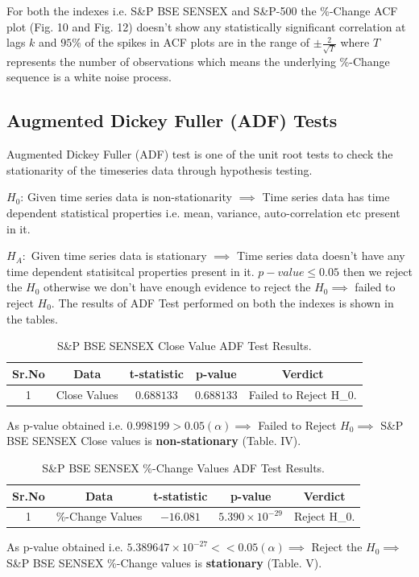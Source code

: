 \documentclass[conference]{IEEEtran}
\begin{document}
For both the indexes i.e. S\&P BSE SENSEX and S\&P-500 the \%-Change ACF plot (Fig. 10 and Fig. 12) doesn't show any statistically significant correlation at lags $k$ and $95\%$ of the spikes in ACF plots are in the range of $\pm \frac{2}{\sqrt{T}}$ where $T$ represents the number of observations which means the underlying \%-Change sequence is a white noise process.

\subsection{Augmented Dickey Fuller (ADF) Tests}
Augmented Dickey Fuller (ADF) test is one of the unit root tests to check the stationarity of the timeseries data through hypothesis testing.

$H_{0}$: Given time series data is non-stationarity $\implies$ Time series data has time dependent statistical properties i.e. mean, variance, auto-correlation etc present in it.

$H_{A}:$ Given time series data is stationary $\implies$ Time series data doesn't have any time dependent statisitcal properties present in it. \newline
$p-value \le 0.05$ then we reject the $H_{0}$ otherwise we don't have enough evidence to reject the $H_{0} \implies$ failed to reject $H_{0}.$ \newline
The results of ADF Test performed on both the indexes is shown in the tables.
\begin{table}[htbp]
	\caption{S\&P BSE SENSEX Close Value ADF Test Results.}
	\begin{tabular}{|c|c|c|c|c|}
		\hline
		\textbf{Sr.No} & \textbf{Data} & \textbf{t-statistic} & \textbf{p-value} & \textbf{Verdict}        \\
		\hline
		1              & Close Values  & $0.688133$           & $0.688133$       & Failed to Reject H_{0}. \\
		\hline
	\end{tabular}
\end{table}

As p-value obtained i.e. $0.998199 > 0.05 (\alpha) \implies$ Failed to Reject $H_{0} \implies$ S\&P BSE SENSEX Close values is \textbf{non-stationary} (Table. IV).

\begin{table}[htbp]
	\caption{S\&P BSE SENSEX \%-Change Values ADF Test Results.}
	\centering
	\begin{tabular}{|c|c|c|c|c|}
		\hline
		\textbf{Sr.No} & \textbf{Data}    & \textbf{t-statistic} & \textbf{p-value}        & \textbf{Verdict} \\
		\hline
		1              & \%-Change Values & $-16.081$            & $5.390 \times 10^{-29}$ & Reject H_{0}.    \\
		\hline
	\end{tabular}
\end{table}
As p-value obtained i.e. $5.389647 \times 10^{-27} << 0.05 (\alpha) \implies$ Reject the $H_{0} \implies$ S\&P BSE SENSEX \%-Change values is \textbf{stationary} (Table. V).
\end{document}
